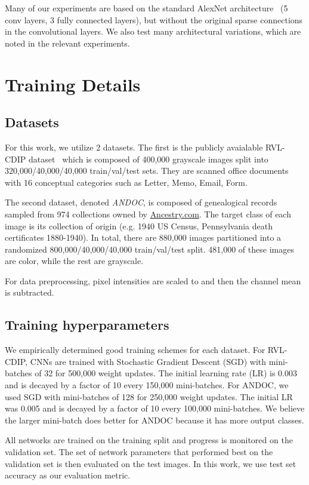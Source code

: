 \documentclass[10pt, conference, compsocconf]{IEEEtran}
\begin{document}
Many of our experiments are based on the standard AlexNet architecture~\cite{krizhevsky12} (5 conv layers, 3 fully connected layers), but without the original sparse connections in the convolutional layers.
We also test many architectural variations, which are noted in the relevant experiments.

\section{Training Details}

\subsection{Datasets}

For this work, we utilize 2 datasets.
The first is the publicly avaialable RVL-CDIP dataset~\cite{harley15} which is composed of 400,000 grayscale images split into 320,000/40,000/40,000 train/val/test sets.
They are scanned office documents with 16 conceptual categories such as Letter, Memo, Email, Form.

The second dataset, denoted \emph{ANDOC}, is composed of genealogical records sampled from 974 collections owned by \url{Ancestry.com}. 
The target class of each image is its collection of origin (e.g. 1940 US Census, Pennsylvania death certificates 1880-1940).
In total, there are 880,000 images partitioned into a randomized 800,000/40,000/40,000 train/val/test split.
481,000 of these images are color, while the rest are grayscale.

For data preprocessing, pixel intensities are scaled to  and then the channel mean is subtracted.

\subsection{Training hyperparameters}

We empirically determined good training schemes for each dataset.
For RVL-CDIP, CNNs are trained with Stochastic Gradient Descent (SGD) with mini-batches of 32 for 500,000 weight updates.
The initial learning rate (LR) is 0.003 and is decayed by a factor of 10 every 150,000 mini-batches.
For ANDOC, we used SGD with mini-batches of 128 for 250,000 weight updates.
The initial LR was 0.005 and is decayed by a factor of 10 every 100,000 mini-batches.
We believe the larger mini-batch does better for ANDOC because it has more output classes.

All networks are trained on the training split and progress is monitored on the validation set.  
The set of network parameters that performed best on the validation set is then evaluated on the test images.
In this work, we use test set accuracy as our evaluation metric.
\end{document}
